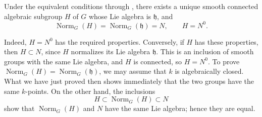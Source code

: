 \begin{corollary}
Under the equivalent conditions  through , there exists a
unique smooth connected algebraic subgroup \(H\) of \(G\) whose Lie
algebra is \(\mathfrak h\), and
\[
  \operatorname{Norm}_G(H)
  =\operatorname{Norm}_G(\mathfrak h)
  =N,
  \qquad
  H=N^0.
\]
\end{corollary}

Indeed, \(H=N^0\) has the required properties. Conversely, if \(H\)
has these properties, then \(H\subset N\), since \(H\) normalizes its
Lie algebra \(\mathfrak h\). This is an inclusion of smooth groups
with the same Lie algebra, and \(H\) is connected, so \(H=N^0\). To
prove
\(\operatorname{Norm}_G(H)=\operatorname{Norm}_G(\mathfrak h)\), we
may assume that \(k\) is algebraically closed. What we have just proved
then shows immediately that the two groups have the same \(k\)-points.
On the other hand, the inclusions
\[
  H\subset\operatorname{Norm}_G(H)\subset N
\]
show that \(\operatorname{Norm}_G(H)\) and \(N\) have the same Lie
algebra; hence they are equal.


